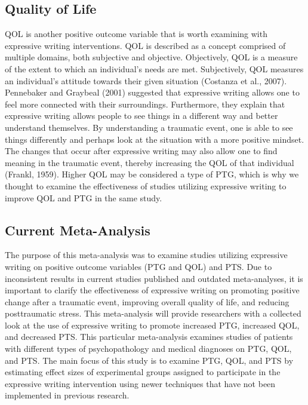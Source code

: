 \documentclass[english,man]{apa6}
\theoremstyle{definition}
\theoremstyle{definition}
\theoremstyle{definition}
\theoremstyle{remark}
\begin{document}
\subsection{Quality of Life}\label{quality-of-life}

QOL is another positive outcome variable that is worth examining with
expressive writing interventions. QOL is described as a concept
comprised of multiple domains, both subjective and objective.
Objectively, QOL is a measure of the extent to which an individual's
needs are met. Subjectively, QOL measures an individual's attitude
towards their given situation (Costanza et al., 2007). Pennebaker and
Graybeal (2001) suggested that expressive writing allows one to feel
more connected with their surroundings. Furthermore, they explain that
expressive writing allows people to see things in a different way and
better understand themselves. By understanding a traumatic event, one is
able to see things differently and perhaps look at the situation with a
more positive mindset. The changes that occur after expressive writing
may also allow one to find meaning in the traumatic event, thereby
increasing the QOL of that individual (Frankl, 1959). Higher QOL may be
considered a type of PTG, which is why we thought to examine the
effectiveness of studies utilizing expressive writing to improve QOL and
PTG in the same study.

\subsection{Current Meta-Analysis}\label{current-meta-analysis}

The purpose of this meta-analysis was to examine studies utilizing
expressive writing on positive outcome variables (PTG and QOL) and PTS.
Due to inconsistent results in current studies published and outdated
meta-analyses, it is important to clarify the effectiveness of
expressive writing on promoting positive change after a traumatic event,
improving overall quality of life, and reducing posttraumatic stress.
This meta-analysis will provide researchers with a collected look at the
use of expressive writing to promote increased PTG, increased QOL, and
decreased PTS. This particular meta-analysis examines studies of
patients with different types of psychopathology and medical diagnoses
on PTG, QOL, and PTS. The main focus of this study is to examine PTG,
QOL, and PTS by estimating effect sizes of experimental groups assigned
to participate in the expressive writing intervention using newer
techniques that have not been implemented in previous research.
\end{document}
